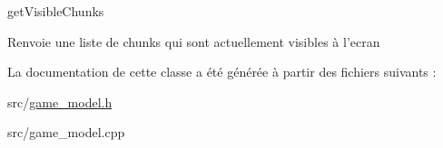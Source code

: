 get\+Visible\+Chunks 

\begin{DoxyReturn}{Renvoie}
une liste de chunks qui sont actuellement visibles à l'ecran 
\end{DoxyReturn}


La documentation de cette classe a été générée à partir des fichiers suivants \+:\begin{DoxyCompactItemize}
\item 
src/\hyperlink{game__model_8h}{game\+\_\+model.\+h}\item 
src/game\+\_\+model.\+cpp\end{DoxyCompactItemize}
